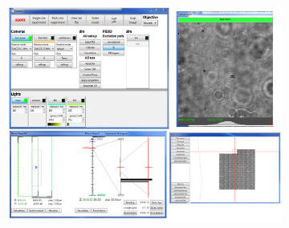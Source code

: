 \begin{figure}[H]
	\centering
	\begin{subfigure}{0.64\textwidth}
		\centering
		\includegraphics[width=1\linewidth, scale=0.5]{images/DeepSIM_control_software.png}
		\caption{}
		\label{fig:DeepSIM_control_software}
	\end{subfigure}
	\begin{subfigure}{0.23\textwidth}
		\centering

\end{subfigure}
\end{figure}
